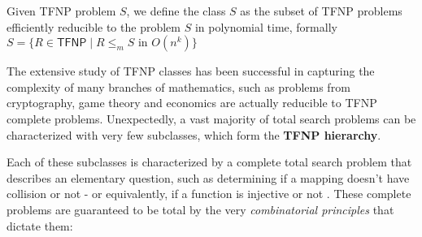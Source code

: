 \begin{definition}
    Given \textsf{TFNP} problem $S$, we define the class $S$ as the subset of \textsf{TFNP} problems efficiently reducible to the problem $S$ in polynomial time, formally $S = \{R \in \mathsf{TFNP} \mid R \leq_m S \text{ in } O(n^k)\}$
\end{definition}

The extensive study of \textsf{TFNP} classes has been successful in capturing the complexity of many branches of mathematics, such as problems from cryptography, game theory and economics are actually reducible to TFNP complete problems. Unexpectedly, a vast majority of total search problems can be characterized with very few subclasses, which form the \textbf{\textsf{TFNP} hierarchy}. 

\newpage

Each of these subclasses is characterized by a complete total search problem that describes an elementary question, such as determining if a mapping doesn't have collision or not - or equivalently, if a function is injective or not \cite{proofs_circuits_communication,tfnp_characterization}. These complete problems are guaranteed to be total by the very \textit{combinatorial principles} that dictate them:

